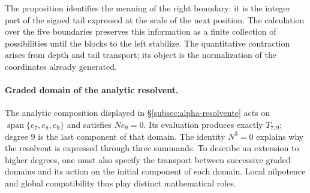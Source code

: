 The proposition identifies the meaning of the right boundary: it is the
integer part of the signed tail expressed at the scale of the next
position. The calculation over the five boundaries preserves this information
as a finite collection of possibilities until the blocks to the
left stabilize. The quantitative contraction arises from
depth and tail transport; its object is the normalization of
the coordinates already generated.

\paragraph{Graded domain of the analytic resolvent.}
\label{ampl-alfa-dominio-resolvente}
The analytic composition displayed in
\S\ref{subsec:alpha-resolvente} acts on
$\operatorname{span}\{e_7,e_8,e_9\}$ and satisfies $Ne_9=0$. Its
evaluation produces exactly $T_{7:9}$; degree $9$ is the last
component of that domain. The identity $N^3=0$ explains why the
resolvent is expressed through three summands. To describe an
extension to higher degrees, one must also specify
the transport between successive graded domains and its action on the
initial component of each domain. Local nilpotence and
global compatibility thus play distinct mathematical roles.
